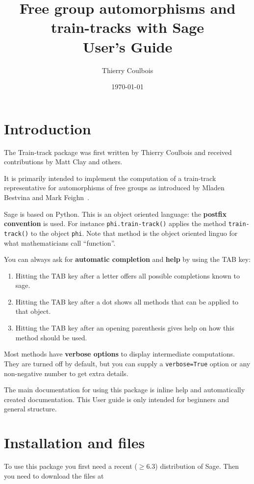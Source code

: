 \documentclass[10pt,a4paper]{article}
\title{Free group automorphisms and train-tracks with Sage\\
User's Guide}
\author{Thierry Coulbois}
\date{\today}
\begin{document}
\maketitle



\section{Introduction}

The Train-track package was first written by Thierry Coulbois and
received contributions by Matt Clay and others.

It is primarily intended to implement the computation of a train-track
representative for automorphisms of free groups as introduced by
Mladen Bestvina and Mark Feighn~\cite{bf-train-track}.


Sage is based on Python. This is an object oriented language: the
\textbf{postfix convention} is used. For instance
\texttt{phi.train-track()} applies the method \texttt{train-track()}
to the object \texttt{phi}. Note that method is the
object oriented linguo for what mathematicians call ``function''.

You can always ask for \textbf{automatic completion} and \textbf{help} by using the TAB key: 
\begin{enumerate}
\item Hitting the TAB key after a letter offers all possible
  completions known to sage.
\item Hitting the TAB key after a dot shows all methods that can be
  applied to that object.
\item Hitting the TAB key after an opening parenthesis gives help on
  how this method should be used.
\end{enumerate}

Most methods have \textbf{verbose options} to display intermediate
computations. They are turned off by default, but you can supply a
\texttt{verbose=True} option or any non-negative number to get extra
details.

The main documentation for using this package is inline help and
automatically created documentation. This User guide is only
intended for beginners and general structure.

\section{Installation and files}

To use this package you first need a recent ($\geq 6.3$) distribution
of Sage. Then you need to download the files at
\end{document}

